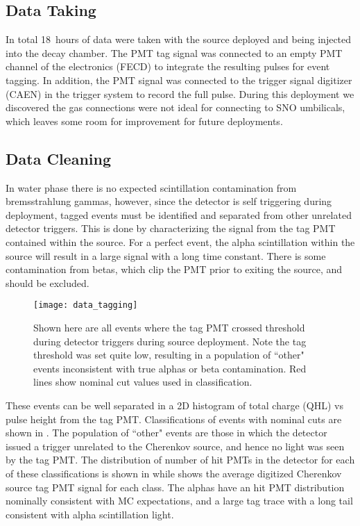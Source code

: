 \subsection{Data Taking}
In total 18~hours of data were taken with the source deployed and \Li being injected into the decay chamber.
The PMT tag signal was connected to an empty PMT channel of the {\snop} electronics (FECD) to integrate the resulting pulses for event tagging.
In addition, the PMT signal was connected to the trigger signal digitizer (CAEN) in the {\snop} trigger system to record the full pulse.
During this deployment we discovered the gas connections were not ideal for connecting to SNO umbilicals, which leaves some room for improvement for future deployments.

\subsection{Data Cleaning}
In water phase there is no expected scintillation contamination from bremsstrahlung gammas, however, since the detector is self triggering during deployment, tagged events must be identified and separated from other unrelated detector triggers.
This is done by characterizing the signal from the tag PMT contained within the source.
For a perfect event, the alpha scintillation within the source will result in a large signal with a long time constant.
There is some contamination from \Li betas, which clip the PMT prior to exiting the source, and should be excluded.


\begin{figure}
\centering
\texttt{[image: data\_tagging]}
\caption{\label{fig:chsrc_classify} Shown here are all events where the tag PMT crossed threshold during detector triggers during source deployment. Note the tag threshold was set quite low, resulting in a population of ``other" events inconsistent with true alphas or beta contamination. Red lines show nominal cut values used in classification.}
\end{figure}

These events can be well separated in a 2D histogram of total charge (QHL) vs pulse height from the tag PMT. 
Classifications of events with nominal cuts are shown in .
The population of ``other" events are those in which the detector issued a trigger unrelated to the Cherenkov source, and hence no light was seen by the tag PMT.
The distribution of number of hit PMTs in the {\snop} detector for each of these classifications is shown in  while  shows the average digitized Cherenkov source tag PMT signal for each class.
The alphas have an hit PMT distribution nominally consistent with MC expectations, and a large tag trace with a long tail consistent with alpha scintillation light.



